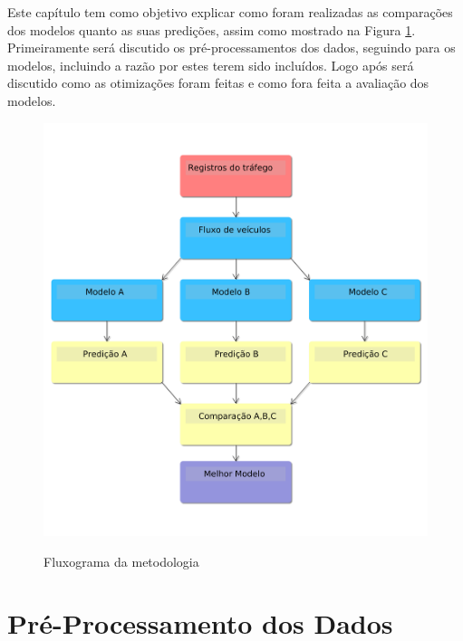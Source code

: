 


Este capítulo tem como objetivo explicar como foram realizadas as comparações dos modelos quanto as suas predições, assim como mostrado na Figura \ref{figure:metodologia}. Primeiramente será discutido os pré-processamentos dos dados, seguindo para os modelos, incluindo a razão por estes terem sido incluídos. Logo após será discutido como as otimizações foram feitas e como fora feita a avaliação dos modelos.


\begin{figure}
    \centering
    \includegraphics[scale=0.4]{monography/img/tccFlux.png}
    \label{figure:metodologia}
    \caption[Fluxograma da metodologia]{Fluxograma da metodologia}
\end{figure}

\section{Pré-Processamento dos Dados}



